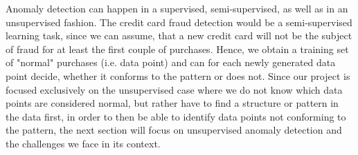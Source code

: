 \documentclass{vldb}
\begin{document}
Anomaly detection can happen in a supervised, semi-supervised, as well as in an unsupervised fashion. The credit card fraud detection would be a semi-supervised learning task, since we can assume, that a new credit card will not be the subject of fraud for at least the first couple of purchases. Hence, we obtain a training set of "normal" purchases (i.e. data point) and can for each newly generated data point decide, whether it conforms to the pattern or does not. Since our project is focused exclusively on the unsupervised case where we do not know which data points are considered normal, but rather have to find a structure or pattern in the data first, in order to then be able to identify data points not conforming to the pattern, the next section will focus on unsupervised anomaly detection and the challenges we face in its context.
\end{document}
